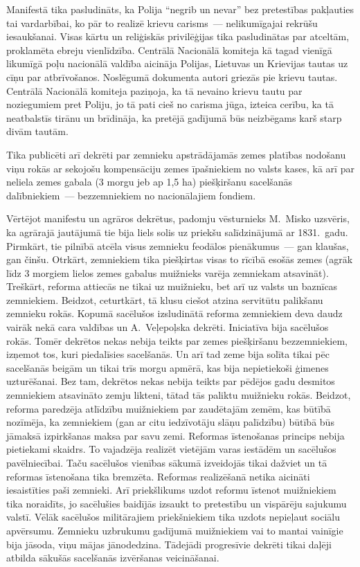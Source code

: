 \documentclass[twoside,a5paper,12pt,fleqn,openany]{extbook}
\begin{document}
Manifestā tika pasludināts, ka Polija ``negrib un nevar'' bez pretestības pakļauties tai vardarbībai, ko pār to realizē krievu carisms~--- nelikumīgajai rekrūšu iesaukšanai. Visas kārtu un reliģiskās privilēģijas tika pasludinātas par atceltām, proklamēta ebreju vienlīdzība. Centrālā Nacionālā komiteja kā tagad vienīgā likumīgā poļu nacionālā valdība aicināja Polijas, Lietuvas un Krievijas tautas uz cīņu par atbrīvošanos. Noslēgumā dokumenta autori griezās pie krievu tautas. Centrālā Nacionālā komiteja paziņoja, ka tā nevaino krievu tautu par noziegumiem pret Poliju, jo tā pati cieš no carisma jūga, izteica cerību, ka tā neatbalstīs tirānu un brīdināja, ka pretējā gadījumā būs neizbēgams karš starp divām tautām.

Tika publicēti arī dekrēti par zemnieku apstrādājamās zemes platības nodošanu viņu rokās ar sekojošu kompensāciju zemes īpašniekiem no valsts kases, kā arī par neliela zemes gabala (3 morgu jeb ap 1,5 ha) piešķiršanu sacelšanās dalībniekiem~--- bezzemniekiem no nacionālajiem fondiem.

Vērtējot manifestu un agrāros dekrētus, padomju vēsturnieks M.~Misko uzsvēris, ka agrārajā jautājumā tie bija liels solis uz priekšu salīdzinājumā ar 1831.~gadu. Pirmkārt, tie pilnībā atcēla visus zemnieku feodālos pienākumus~--- gan klaušas, gan činšu. Otrkārt, zemniekiem tika piešķirtas visas to rīcībā esošās zemes (agrāk līdz 3 morgiem lielos zemes gabalus muižnieks varēja zemniekam atsavināt). Treškārt, reforma attiecās ne tikai uz muižnieku, bet arī uz valsts un baznīcas zemniekiem. Beidzot, ceturtkārt, tā klusu ciešot atzina servitūtu palikšanu zemnieku rokās. Kopumā sacēlušos izsludinātā reforma zemniekiem deva daudz vairāk nekā cara valdības un A.~Veļepoļska dekrēti. Iniciatīva bija sacēlušos rokās. Tomēr dekrētos nekas nebija teikts par zemes piešķiršanu bezzemniekiem, izņemot tos, kuri piedalīsies sacelšanās. Un arī tad zeme bija solīta tikai pēc sacelšanās beigām un tikai trīs morgu apmērā, kas bija nepietiekoši ģimenes uzturēšanai. Bez tam, dekrētos nekas nebija teikts par pēdējos gadu desmitos zemniekiem atsavināto zemju likteni, tātad tās paliktu muižnieku rokās. Beidzot, reforma paredzēja atlīdzību muižniekiem par zaudētajām zemēm, kas būtībā nozīmēja, ka zemniekiem (gan ar citu iedzīvotāju slāņu palīdzību) būtībā būs jāmaksā izpirkšanas maksa par savu zemi. Reformas īstenošanas princips nebija pietiekami skaidrs. To vajadzēja realizēt vietējām varas iestādēm un sacēlušos pavēlniecībai. Taču sacēlušos vienības sākumā izveidojās tikai dažviet un tā reformas īstenošana tika bremzēta. Reformas realizēšanā netika aicināti iesaistīties paši zemnieki. Arī priekšlikums uzdot reformu īstenot muižniekiem tika noraidīts, jo sacēlušies baidījās izsaukt to pretestību un vispārēju sajukumu valstī. Vēlāk sacēlušos militārajiem priekšniekiem tika uzdots nepieļaut sociālu apvērsumu. Zemnieku uzbrukumu gadījumā muižniekiem vai to mantai vainīgie bija jāsoda, viņu mājas jānodedzina. Tādejādi progresīvie dekrēti tikai daļēji atbilda sākušās sacelšanās izvēršanas veicināšanai.
\end{document}
